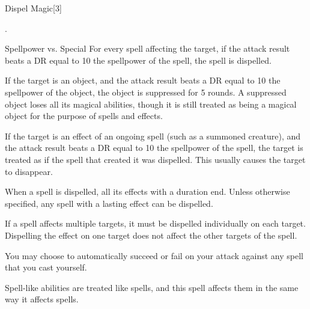 \begin{spellsection}{Dispel Magic}[3]
    \begin{spellheader}
        .
    \end{spellheader}
    \begin{spellcontent}
        \begin{spelltargetinginfo}
        \end{spelltargetinginfo}
        \begin{spelleffects}
            \begin{spellattack}{Spellpower vs. Special}
                \spelleffect For every spell affecting the target, if the attack result beats a DR equal to 10 \add the spellpower of the spell, the spell is dispelled.

                If the target is an object, and the attack result beats a DR equal to 10 \add the spellpower of the object, the object is suppressed for 5 rounds. A suppressed object loses all its magical abilities, though it is still treated as being a magical object for the purpose of spells and effects.

                If the target is an effect of an ongoing spell (such as a summoned creature), and the attack result beats a DR equal to 10 \add the spellpower of the spell, the target is treated as if the spell that created it was dispelled. This usually causes the target to disappear.
            \end{spellattack}
        \end{spelleffects}
    \end{spellcontent}
    \begin{spellfooter}
        \spellnotes When a spell is dispelled, all its effects with a duration end. Unless otherwise specified, any spell with a lasting effect can be dispelled.

        If a spell affects multiple targets, it must be dispelled individually on each target. Dispelling the effect on one target does not affect the other targets of the spell.

        You may choose to automatically succeed or fail on your attack against any spell that you cast yourself.

        Spell-like abilities are treated like spells, and this spell affects them in the same way it affects spells.


\end{spellfooter}
\end{spellsection}
